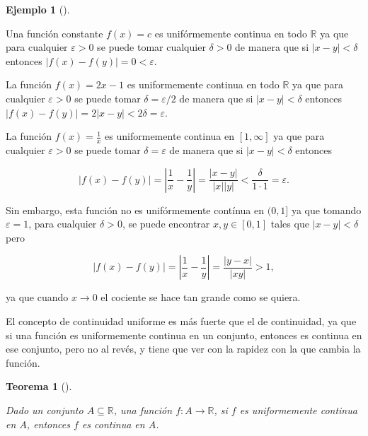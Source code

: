 \documentclass[
  a4paper,
]{scrreport}
\theoremstyle{definition}
\theoremstyle{definition}
\newtheorem{example}{Ejemplo}[chapter]
\theoremstyle{definition}
\theoremstyle{plain}
\newtheorem{theorem}{Teorema}[chapter]
\theoremstyle{plain}
\theoremstyle{plain}
\theoremstyle{remark}
\begin{document}
\begin{example}[]\protect\hypertarget{exm-funcion-uniformemente-continua}{}\label{exm-funcion-uniformemente-continua}

Una función constante \(f(x)=c\) es unifórmemente continua en todo
\(\mathbb{R}\) ya que para cualquier \(\varepsilon>0\) se puede tomar
cualquier \(\delta>0\) de manera que si \(|x-y|<\delta\) entonces
\(|f(x)-f(y)|=0<\varepsilon\).

La función \(f(x)=2x-1\) es uniformemente continua en todo
\(\mathbb{R}\) ya que para cualquier \(\varepsilon>0\) se puede tomar
\(\delta=\varepsilon/2\) de manera que si \(|x-y|<\delta\) entonces
\(|f(x)-f(y)|=2|x-y|<2\delta=\varepsilon\).

La función \(f(x)=\frac{1}{x}\) es uniformemente continua en
\([1,\infty]\) ya que para cualquier \(\varepsilon>0\) se puede tomar
\(\delta=\varepsilon\) de manera que si \(|x-y|<\delta\) entonces

\[
|f(x)-f(y)|=\left|\frac{1}{x}-\frac{1}{y}\right|=\frac{|x-y|}{|x||y|}<\frac{\delta}{1\cdot 1}=\varepsilon. 
\]

Sin embargo, esta función no es unifórmemente contínua en \((0,1]\) ya
que tomando \(\varepsilon=1\), para cualquier \(\delta>0\), se puede
encontrar \(x,y\in[0,1]\) tales que \(|x-y|<\delta\) pero

\[
|f(x)-f(y)|=\left|\frac{1}{x}-\frac{1}{y}\right|=\frac{|y-x|}{|xy|}>1,
\]

ya que cuando \(x\to 0\) el cociente se hace tan grande como se quiera.

\end{example}

El concepto de continuidad uniforme es más fuerte que el de continuidad,
ya que si una función es uniformemente continua en un conjunto, entonces
es continua en ese conjunto, pero no al revés, y tiene que ver con la
rapidez con la que cambia la función.

\begin{theorem}[]\protect\hypertarget{thm-funcion-uniformemente-continua}{}\label{thm-funcion-uniformemente-continua}

Dado un conjunto \(A\subseteq \mathbb{R}\), una función
\(f:A\to \mathbb{R}\), si \(f\) es uniformemente continua en \(A\),
entonces \(f\) es continua en \(A\).

\end{theorem}
\end{document}
